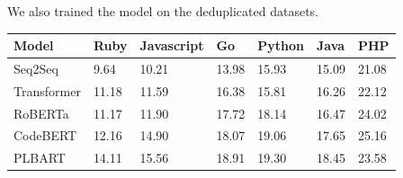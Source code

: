 We also trained the model on the deduplicated datasets. 
\label{tab:codeT5Baseline}
\begin{table}[H]
\centering
\begin{tabular}{|l|llllll}
\hline
\rowcolor[HTML]{C0C0C0} 
Model                 & \multicolumn{1}{l|}{\cellcolor[HTML]{C0C0C0}Ruby} & \multicolumn{1}{l|}{\cellcolor[HTML]{C0C0C0}Javascript} & \multicolumn{1}{l|}{\cellcolor[HTML]{C0C0C0}Go} & \multicolumn{1}{l|}{\cellcolor[HTML]{C0C0C0}Python} & \multicolumn{1}{l|}{\cellcolor[HTML]{C0C0C0}Java} & \multicolumn{1}{l|}{\cellcolor[HTML]{C0C0C0}PHP} \\ \hline
Seq2Seq               & 9.64                                              & 10.21                                                   & 13.98                                           & 15.93                                               & 15.09                                             & 21.08                                            \\ \cline{1-1}
Transformer           & 11.18                                             & 11.59                                                   & 16.38                                           & 15.81                                               & 16.26                                             & 22.12                                            \\ \cline{1-1}
RoBERTa               & 11.17                                             & 11.90                                                   & 17.72                                           & 18.14                                               & 16.47                                             & 24.02                                            \\ \cline{1-1}
CodeBERT              & 12.16                                             & 14.90                                                   & 18.07                                           & 19.06                                               & 17.65                                             & 25.16                                            \\ \cline{1-1}
PLBART                & 14.11                                             & 15.56                                                   & 18.91                                           & 19.30                                               & 18.45                                             & 23.58                                            \\ \cline{1-1}

\end{tabular}
\end{table}
